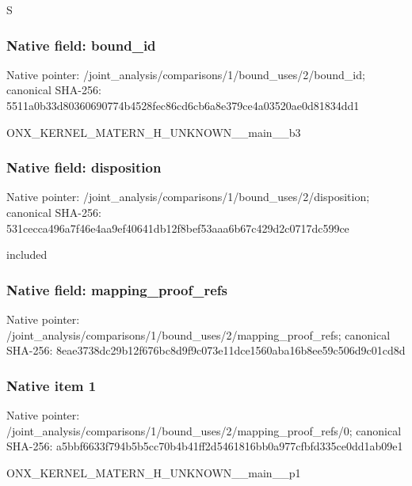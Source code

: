 \documentclass[10pt,a4paper]{article}
\begin{document}
\begingroup\raggedright\sloppy S\par\endgroup

\subsubsection{Native field: bound\_\allowbreak{}id}
Native pointer: /joint\_\allowbreak{}analysis/comparisons/1/bound\_\allowbreak{}uses/2/bound\_\allowbreak{}id; canonical SHA-256: 5511a0b33d80360690774b4528fec86cd6cb6a8e379ce4a03520ae0d81834dd1

\begingroup\raggedright\sloppy ONX\_\allowbreak{}KERNEL\_\allowbreak{}MATERN\_\allowbreak{}H\_\allowbreak{}UNKNOWN\_\allowbreak{}\_\allowbreak{}main\_\allowbreak{}\_\allowbreak{}b3\par\endgroup

\subsubsection{Native field: disposition}
Native pointer: /joint\_\allowbreak{}analysis/comparisons/1/bound\_\allowbreak{}uses/2/disposition; canonical SHA-256: 531cecca496a7f46e4aa9ef40641db12f8bef53aaa6b67c429d2c0717dc599ce

\begingroup\raggedright\sloppy included\par\endgroup

\subsubsection{Native field: mapping\_\allowbreak{}proof\_\allowbreak{}refs}
Native pointer: /joint\_\allowbreak{}analysis/comparisons/1/bound\_\allowbreak{}uses/2/mapping\_\allowbreak{}proof\_\allowbreak{}refs; canonical SHA-256: 8eae3738dc29b12f676bc8d9f9c073e11dce1560aba16b8ee59c506d9c01cd8d

\subsubsection{Native item 1}
Native pointer: /joint\_\allowbreak{}analysis/comparisons/1/bound\_\allowbreak{}uses/2/mapping\_\allowbreak{}proof\_\allowbreak{}refs/0; canonical SHA-256: a5bbf6633f794b5b5cc70b4b41ff2d5461816bb0a977cfbfd335ce0dd1ab09e1

\begingroup\raggedright\sloppy ONX\_\allowbreak{}KERNEL\_\allowbreak{}MATERN\_\allowbreak{}H\_\allowbreak{}UNKNOWN\_\allowbreak{}\_\allowbreak{}main\_\allowbreak{}\_\allowbreak{}p1\par\endgroup
\end{document}
